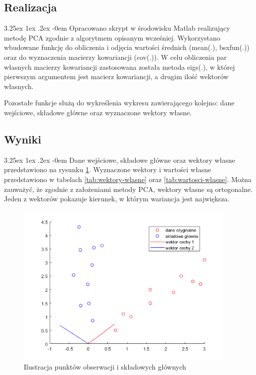 \documentclass[11pt, a4paper]{article}
\makeatletter
\newcommand{\fbi}{\leavevmode{\parindent=1em\indent}}
\renewcommand\paragraph{\@startsection{paragraph}{5}{\z@}
  {3.25ex \@plus1ex \@minus.2ex}
  {-0em}
  {\normalfont\normalsize\bfseries}}
\makeatother
\begin{document}
\subsection{Realizacja}
\paragraph{}
Opracowano skrypt w środowisku Matlab realizujący metodę PCA zgodnie z algorytmem opisanym wcześniej. Wykorzystano wbudowane funkcję do obliczenia i odjęcia wartości średnich (mean(.), bsxfun(.)) oraz do wyznaczenia macierzy kowariancji (cov(.)). W celu obliczenia par własnych macierzy kowariancji zastosowana została metoda eigs(.), w której pierwszym argumentem jest macierz kowariancji, a drugim ilość wektorów własnych.



\fbi
Pozostałe funkcje służą do wykreślenia wykresu zawierającego kolejno: dane wejściowe, składowe główne oraz wyznaczone wektory własne. 

\subsection{Wyniki}
\paragraph{}
Dane wejściowe, składowe główne oraz wektory własne przedstawiono na rysunku \ref{fig:zad1}. Wyznaczone wektory i wartości własne przedstawiono w tabelach \ref{tab:wektory-wlasne} oraz \ref{tab:wartosci-wlasne}. Można zauważyć, że zgodnie z założeniami metody PCA, wektory własne są ortogonalne. Jeden z wektorów pokazuje kierunek, w którym wariancja jest największa.

\begin{figure}[H]
	\centering
	\includegraphics[width=0.95\textwidth]{./assets/ilustracja_zad1_normalizacja.png}
	\caption{Ilustracja punktów obserwacji i składowych głównych}
	\label{fig:zad1}
\end{figure}
\end{document}
